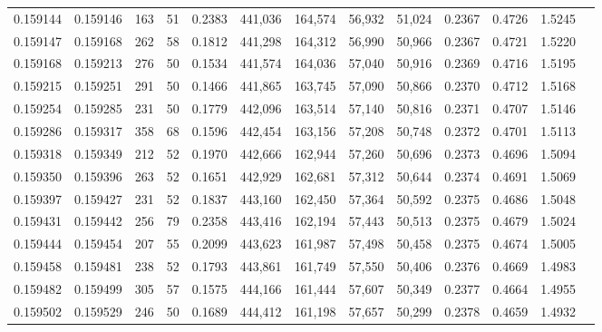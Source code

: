 \begin{tabular}{rrrrrrrrrrrrr}
0.159144 & 0.159146 &   163 &  51 &                                     0.2383 & 441,036 & 164,574 &  56,932 &  51,024 & 0.2367 & 0.4726 & 1.5245 \\
0.159147 & 0.159168 &   262 &  58 &                                     0.1812 & 441,298 & 164,312 &  56,990 &  50,966 & 0.2367 & 0.4721 & 1.5220 \\
0.159168 & 0.159213 &   276 &  50 &                                     0.1534 & 441,574 & 164,036 &  57,040 &  50,916 & 0.2369 & 0.4716 & 1.5195 \\
0.159215 & 0.159251 &   291 &  50 &                                     0.1466 & 441,865 & 163,745 &  57,090 &  50,866 & 0.2370 & 0.4712 & 1.5168 \\
0.159254 & 0.159285 &   231 &  50 &                                     0.1779 & 442,096 & 163,514 &  57,140 &  50,816 & 0.2371 & 0.4707 & 1.5146 \\
0.159286 & 0.159317 &   358 &  68 &                                     0.1596 & 442,454 & 163,156 &  57,208 &  50,748 & 0.2372 & 0.4701 & 1.5113 \\
0.159318 & 0.159349 &   212 &  52 &                                     0.1970 & 442,666 & 162,944 &  57,260 &  50,696 & 0.2373 & 0.4696 & 1.5094 \\
0.159350 & 0.159396 &   263 &  52 &                                     0.1651 & 442,929 & 162,681 &  57,312 &  50,644 & 0.2374 & 0.4691 & 1.5069 \\
0.159397 & 0.159427 &   231 &  52 &                                     0.1837 & 443,160 & 162,450 &  57,364 &  50,592 & 0.2375 & 0.4686 & 1.5048 \\
0.159431 & 0.159442 &   256 &  79 &                                     0.2358 & 443,416 & 162,194 &  57,443 &  50,513 & 0.2375 & 0.4679 & 1.5024 \\
0.159444 & 0.159454 &   207 &  55 &                                     0.2099 & 443,623 & 161,987 &  57,498 &  50,458 & 0.2375 & 0.4674 & 1.5005 \\
0.159458 & 0.159481 &   238 &  52 &                                     0.1793 & 443,861 & 161,749 &  57,550 &  50,406 & 0.2376 & 0.4669 & 1.4983 \\
0.159482 & 0.159499 &   305 &  57 &                                     0.1575 & 444,166 & 161,444 &  57,607 &  50,349 & 0.2377 & 0.4664 & 1.4955 \\
0.159502 & 0.159529 &   246 &  50 &                                     0.1689 & 444,412 & 161,198 &  57,657 &  50,299 & 0.2378 & 0.4659 & 1.4932 \\

\end{tabular}
